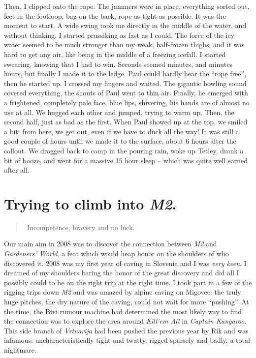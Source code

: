 Then, I clipped onto the rope. The jammers were in place, everything
sorted out, feet in the footloop, bag on the back, rope as tight as
possible. It was the moment to start. A wide swing took me directly in
the middle of the water, and without thinking, I started prussiking as
fast as I could. The force of the icy water seemed to be much stronger
than my weak, half-frozen thighs, and it was hard to get any air, like
being in the middle of a freezing icefall. I started swearing, knowing
that I had to win. Seconds seemed minutes, and minutes hours, but
finally I made it to the ledge. Paul could hardly hear the ``rope
free'', then he started up. I crossed my fingers and waited. The
gigantic howling sound covered everything, the shouts of Paul went to
thin air. Finally, he emerged with a frightened, completely pale face,
blue lips, shivering, his hands are of almost no use at all. We hugged
each other and jumped, trying to warm up. Then, the second half, just as
bad as the first. When Paul showed up at the top, we smiled a bit: from
here, we get out, even if we have to duck all the way! It was still a
good couple of hours until we made it to the surface, about 6 hours
after the callout. We dragged back to camp in the pouring rain, woke up
Tetley, drank a bit of booze, and went for a massive 15 hour sleep --
which was quite well earned after all.


\hypertarget{trying-to-climb-into-m2.}{%
\section{\texorpdfstring{Trying to climb into
\emph{M2}.}{Trying to climb into M2.}}\label{trying-to-climb-into-m2.}}

\begin{quote} Incompetence, bravery and no luck. \end{quote}

Our main aim in 2008 was to discover the connection between \emph{M2}
and \emph{Gardeners' World}, a feat which would heap honor on the
shoulders of who discovered it. 2008 was my first year of caving in
Slovenia and I was \textit{very keen}. I dreamed of my shoulders baring
the honor of the great discovery and did all I possibly could to be on
the right trip at the right time. I took part in a few of the rigging
trips down \emph{M2} and was amazed by alpine caving on Migovec: the
truly huge pitches, the dry nature of the caving, could not wait for
more ``pushing''. At the time, the Bivi rumour machine had determined
the most likely way to find the connection was to explore the area
around \emph{Kill'em All} in \emph{Captain Kangaroo}. This side branch
of \emph{Vrtnarija} had been pushed the previous year by Rik and was
infamous: uncharacteristically tight and twatty, rigged sparsely and
badly, a total nightmare.

